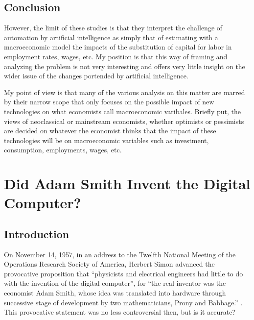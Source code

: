 \documentclass[version=last,draft=false,paper=A4,portrait,twoside=true,twocolumn=false,headinclude=false,footinclude=false,mpinclude=true,fontsize=12,BCOR=20mm,DIV=calc,pagesize=auto,open=right,chapterprefix=true,numbers=autoendperiod,headsepline=false,headings=twolinechapter,parskip=false]{scrbook}
\begin{document}
\section{Conclusion}
\label{sec:org5187f67}
However, the limit of these studies is that they interpret the challenge of
automation by artificial intelligence as simply that of estimating with a
macroeconomic model the impacts of the substitution of capital for labor in
employment rates, wages, etc. My position is that this way of framing and
analyzing the problem is not very interesting and offers very little
insight on the wider issue of the changes portended by artificial
intelligence.

My point of view is that many of the various analysis on this matter are
marred by their narrow scope that only focuses on the possible impact of
new technologies on what economists call macroeconomic varibales. Briefly
put, the views of neoclassical or mainstream economists, whether optimists
or pessimists are decided on whatever the economist thinks that the impact
of these technologies will be on macroeconomic variables such as
investment, consumption, employments, wages, etc.

\chapter{Did Adam Smith Invent the Digital Computer?}
\label{sec:orge9af4f4}
\section{Introduction}
\label{sec:org3575d3a}
On November 14, 1957, in an address to the Twelfth National Meeting of the
Operations Research Society of America, Herbert Simon advanced the
provocative proposition that ``physicists and electrical engineers had
little to do with the invention of the digital computer'', for ``the real
inventor was the economist Adam Smith, whose idea was translated into
hardware through successive stage of development by two mathematicians,
Prony and Babbage.'' \autocite[p. 2]{simon_newell1958}. This provocative
statement was no less controversial then, but is it accurate? 
\end{document}
